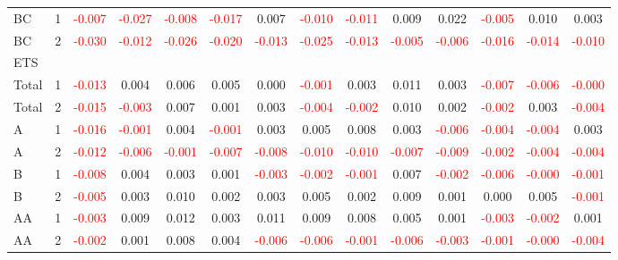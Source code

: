\begin{table}[!htb]
{\begin{tabular}{llcccccccccccc}
BC & 1 & \textcolor{red}{-0.007} & \textcolor{red}{-0.027} & \textcolor{red}{-0.008} & \textcolor{red}{-0.017} & 0.007 & \textcolor{red}{-0.010} & \textcolor{red}{-0.011} & 0.009 & 0.022 & \textcolor{red}{-0.005} & 0.010 & 0.003\\
BC & 2 & \textcolor{red}{-0.030} & \textcolor{red}{-0.012} & \textcolor{red}{-0.026} & \textcolor{red}{-0.020} & \textcolor{red}{-0.013} & \textcolor{red}{-0.025} & \textcolor{red}{-0.013} & \textcolor{red}{-0.005} & \textcolor{red}{-0.006} & \textcolor{red}{-0.016} & \textcolor{red}{-0.014} & \textcolor{red}{-0.010}\\
\hline
ETS &  &  &  &  &  &  &  &  &  &  &  &  & \\
\hline
Total & 1 & \textcolor{red}{-0.013} & 0.004 & 0.006 & 0.005 & 0.000 & \textcolor{red}{-0.001} & 0.003 & 0.011 & 0.003 & \textcolor{red}{-0.007} & \textcolor{red}{-0.006} & \textcolor{red}{-0.000}\\
Total & 2 & \textcolor{red}{-0.015} & \textcolor{red}{-0.003} & 0.007 & 0.001 & 0.003 & \textcolor{red}{-0.004} & \textcolor{red}{-0.002} & 0.010 & 0.002 & \textcolor{red}{-0.002} & 0.003 & \textcolor{red}{-0.004}\\
A & 1 & \textcolor{red}{-0.016} & \textcolor{red}{-0.001} & 0.004 & \textcolor{red}{-0.001} & 0.003 & 0.005 & 0.008 & 0.003 & \textcolor{red}{-0.006} & \textcolor{red}{-0.004} & \textcolor{red}{-0.004} & 0.003\\
A & 2 & \textcolor{red}{-0.012} & \textcolor{red}{-0.006} & \textcolor{red}{-0.001} & \textcolor{red}{-0.007} & \textcolor{red}{-0.008} & \textcolor{red}{-0.010} & \textcolor{red}{-0.010} & \textcolor{red}{-0.007} & \textcolor{red}{-0.009} & \textcolor{red}{-0.002} & \textcolor{red}{-0.004} & \textcolor{red}{-0.004}\\
B & 1 & \textcolor{red}{-0.008} & 0.004 & 0.003 & 0.001 & \textcolor{red}{-0.003} & \textcolor{red}{-0.002} & \textcolor{red}{-0.001} & 0.007 & \textcolor{red}{-0.002} & \textcolor{red}{-0.006} & \textcolor{red}{-0.000} & \textcolor{red}{-0.001}\\
B & 2 & \textcolor{red}{-0.005} & 0.003 & 0.010 & 0.002 & 0.003 & 0.005 & 0.002 & 0.009 & 0.001 & 0.000 & 0.005 & \textcolor{red}{-0.001}\\
AA & 1 & \textcolor{red}{-0.003} & 0.009 & 0.012 & 0.003 & 0.011 & 0.009 & 0.008 & 0.005 & 0.001 & \textcolor{red}{-0.003} & \textcolor{red}{-0.002} & 0.001\\
AA & 2 & \textcolor{red}{-0.002} & 0.001 & 0.008 & 0.004 & \textcolor{red}{-0.006} & \textcolor{red}{-0.006} & \textcolor{red}{-0.001} & \textcolor{red}{-0.006} & \textcolor{red}{-0.003} & \textcolor{red}{-0.001} & \textcolor{red}{-0.000} & \textcolor{red}{-0.004}\\

\end{tabular}}
\end{table}
